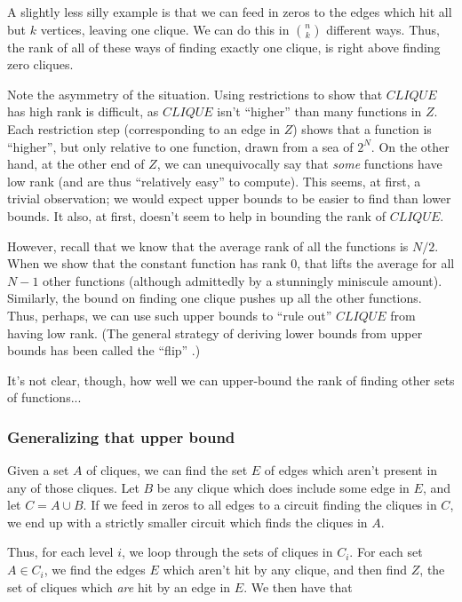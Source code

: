 \documentclass[12pt]{article}
\theoremstyle{definition}
\begin{document}
A slightly less silly example is that we can feed in zeros to 
the edges which hit all but $k$ vertices, leaving one clique.
We can do this in ${n \choose k}$ different ways. Thus, the rank
of all of these ways of finding exactly one clique, is right above
finding zero cliques.

Note the asymmetry of the situation. Using restrictions to show that
$CLIQUE$ has high rank is difficult, as $CLIQUE$ isn't ``higher'' than
many functions in $Z$. Each restriction step (corresponding to an edge in $Z$)
shows that a function is
``higher'', but only relative to one function, drawn from a sea of $2^N$.
On the other hand, at the other end of $Z$, we can unequivocally say
that {\em some} functions have low rank (and are thus
``relatively easy'' to compute).
This seems, at first, a trivial observation; we would expect upper bounds
to be easier to find than lower bounds. It also, at first, doesn't seem
to help in bounding the rank of $CLIQUE$.

However, recall that we know that the average rank of all the functions
is $N/2$.
When we show that the constant function has rank 0, that lifts
the average for all $N-1$ other functions (although admittedly
by a stunningly miniscule amount).
Similarly, the bound on finding one clique pushes up all the other functions.
Thus, perhaps, we can use such upper bounds to ``rule out'' $CLIQUE$ from
having low rank. (The general strategy of deriving lower bounds from
upper bounds has been called the ``flip'' \cite{aaronson_pnp}.)

It's not clear, though, how well we can upper-bound the rank
of finding other sets of functions...

\subsubsection{Generalizing that upper bound}

Given a set $A$ of cliques, we
can find the set $E$ of edges which aren't present in any of those cliques.
Let $B$ be any clique which does include some edge in $E$, and let
$C = A \cup B$. If we feed in zeros to all edges to a circuit
finding the cliques in $C$, we end up with a strictly smaller circuit 
which finds the cliques in $A$.

Thus, for each level $i$, we loop through the sets of cliques in $C_i$.
For each set $A \in C_i$, we find the edges $E$ which aren't hit by any clique, and then
find $Z$, the set of cliques which {\em are} hit by an edge in $E$.
We then have that 
\end{document}
